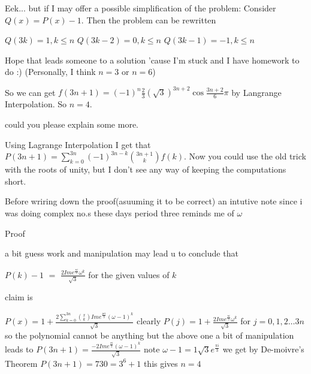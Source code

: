 \begin{solution}
	\begin{tcolorbox}Eek... but if I may offer a possible simplification of the problem:  Consider $Q(x) = P(x) - 1$.  Then the problem can be rewritten

$Q(3k) = 1, k \le n$
$Q(3k-2) = 0, k \le n$
$Q(3k-1) = -1, k \le n$

Hope that leads someone to a solution 'cause I'm stuck and I have homework to do  :)   (Personally, I think $n = 3$ or $n = 6$)\end{tcolorbox}

So we can get $f(3n+1)=(-1)^n\frac{2}{3}(\sqrt{3})^{3n+2}\cos\frac{3n+2}{6}\pi$ by Langrange Interpolation.
So $n=4$.
\end{solution}



\begin{solution}
	could you please explain some more.
\end{solution}



\begin{solution}
	Using Lagrange Interpolation I get that $P(3n+1) = \sum_{k=0}^{3n}(-1)^{3n-k}\binom{3n+1}{k}f(k)$.
Now you could use the old trick with the roots of unity, but I don't see any way of keeping the computations short.
\end{solution}



\begin{solution}
	Before wriring down the proof(asuuming it to be correct) an intutive note since i was doing complex no.s these days period three reminds me of  $\omega$

\begin{italicized}Proof\end{italicized}
a bit guess work and manipulation may lead u to conclude that 

$P(k)-1$ $=$ $\frac{2Ime^{\frac{\pi i}{3}}\omega^{k}}{\sqrt 3}$ for the given values of $k$

claim is 

$P(x)=1+\frac{2\sum_{k=0}^{3n}\binom{x}{k}Ime^{\frac{pi i}{3}}(\omega-1)^{k}}{\sqrt 3}$
clearly  $P(j)=1+\frac{2Ime^{\frac{\pi i}{3}}\omega^{k}}{\sqrt 3}$ for $j=0,1,2\dots 3n$
so the polynomial cannot be anything but the above one
a bit of manipulation leads to 
$P(3n+1)=\frac{-2 Ime^{\frac{\pi i}{3}}(\omega-1)^{k}}{\sqrt 3}$
note $\omega-1=1\sqrt 3 e^{\frac{\pi i}{3}}$
we get by De-moivre's Theorem $P(3n+1)=730=3^{6}+1$
this gives $n=4$
\end{solution}



